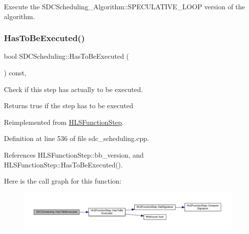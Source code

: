 Execute the S\+D\+C\+Scheduling\+\_\+\+Algorithm\+::\+S\+P\+E\+C\+U\+L\+A\+T\+I\+V\+E\+\_\+\+L\+O\+OP version of the algorithm. 

\mbox{\label{classSDCScheduling_a2c5241704adbd9ab53968c7cbf549560}} 
\subsubsection{\texorpdfstring{Has\+To\+Be\+Executed()}{HasToBeExecuted()}}
{\footnotesize\ttfamily bool S\+D\+C\+Scheduling\+::\+Has\+To\+Be\+Executed (\begin{DoxyParamCaption}{ }\end{DoxyParamCaption}) const\hspace{0.3cm}{\ttfamily [override]}, {\ttfamily [virtual]}}



Check if this step has actually to be executed. 

\begin{DoxyReturn}{Returns}
true if the step has to be executed 
\end{DoxyReturn}


Reimplemented from \hyperlink{classHLSFunctionStep_ac70d2df8fd475639bf9b5c8d492b2d62}{H\+L\+S\+Function\+Step}.



Definition at line 536 of file sdc\+\_\+scheduling.\+cpp.



References H\+L\+S\+Function\+Step\+::bb\+\_\+version, and H\+L\+S\+Function\+Step\+::\+Has\+To\+Be\+Executed().

Here is the call graph for this function\+:
\nopagebreak
\begin{figure}[H]
\begin{center}
\leavevmode
\includegraphics[width=350pt]{d4/dc5/classSDCScheduling_a2c5241704adbd9ab53968c7cbf549560_cgraph}
\end{center}
\end{figure}
\mbox{\label{classSDCScheduling_a6776ee26349c16c789a5b2c33c1fa9ff}} 
